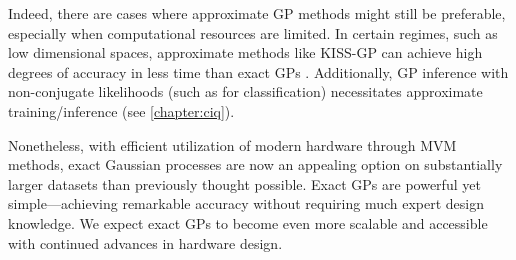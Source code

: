 Indeed, there are cases where approximate GP methods might still be preferable, especially when computational resources are limited.
In certain regimes, such as low dimensional spaces, approximate methods like KISS-GP can achieve high degrees of accuracy in less time than exact GPs \cite{wilson2015kernel}.
Additionally, GP inference with non-conjugate likelihoods (such as for classification) necessitates approximate training/inference (see \cref{chapter:ciq}).

Nonetheless, with efficient utilization of modern hardware through MVM methods, exact Gaussian processes are now an appealing option on substantially larger datasets than previously thought possible.
Exact GPs are powerful yet simple---achieving remarkable accuracy without requiring much expert design knowledge.
We expect exact GPs to become even more scalable and accessible with continued advances in hardware design.
